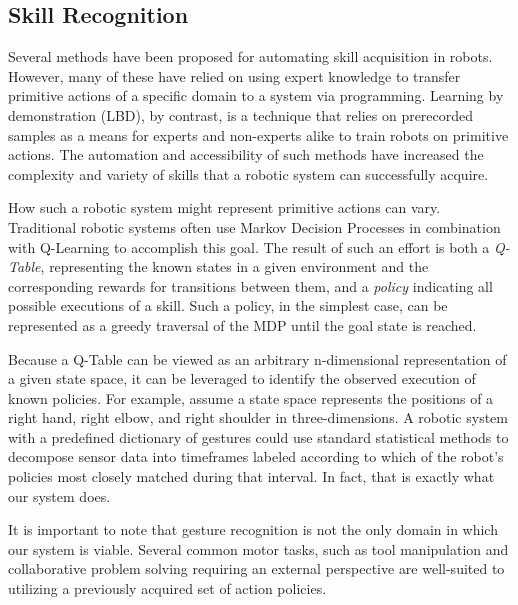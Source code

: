 \documentclass[letterpaper]{article}
\begin{document}
\subsection{Skill Recognition}
  Several methods have been proposed for automating skill acquisition in robots.  However, many of these have relied on using expert knowledge to transfer primitive actions of a specific domain to a system via programming.  Learning by demonstration (LBD), by contrast, is a technique that relies on prerecorded samples as a means for experts and non-experts alike to train robots on primitive actions.  The automation and accessibility of such methods have increased the complexity and variety of skills that a robotic system can successfully acquire.

  How such a robotic system might represent primitive actions can vary.  Traditional robotic systems often use Markov Decision Processes in combination with Q-Learning to accomplish this goal.  The result of such an effort is both a \textit{Q-Table}, representing the known states in a given environment and the corresponding rewards for transitions between them, and a \textit{policy} indicating all possible executions of a skill.  Such a policy, in the simplest case, can be represented as a greedy traversal of the MDP until the goal state is reached.

  Because a Q-Table can be viewed as an arbitrary n-dimensional representation of a given state space, it can be leveraged to identify the observed execution of known policies.  For example, assume a state space represents the positions of a right hand, right elbow, and right shoulder in three-dimensions.  A robotic system with a predefined dictionary of gestures could use standard statistical methods to decompose sensor data into timeframes labeled according to which of the robot's policies most closely matched during that interval.  In fact, that is exactly what our system does.

  It is important to note that gesture recognition is not the only domain in which our system is viable.  Several common motor tasks, such as tool manipulation and collaborative problem solving requiring an external perspective \cite{HRITraftonPerspective} are well-suited to utilizing a previously acquired set of action policies.
\end{document}
